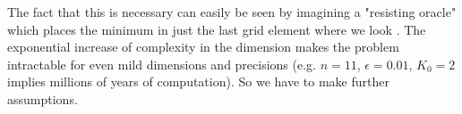The fact that this is necessary can easily be seen by imagining a "resisting
oracle" which places the minimum in just the last grid element where we look
\parencite[cf.][p. 13]{nesterovLecturesConvexOptimization2018}. The exponential
increase of complexity in the dimension makes the problem intractable for even
mild dimensions and precisions (e.g. \(n=11\), \(\epsilon=0.01\), \(K_0=2\)
implies millions of years of computation). So we have to make further
assumptions. 




\endinput
